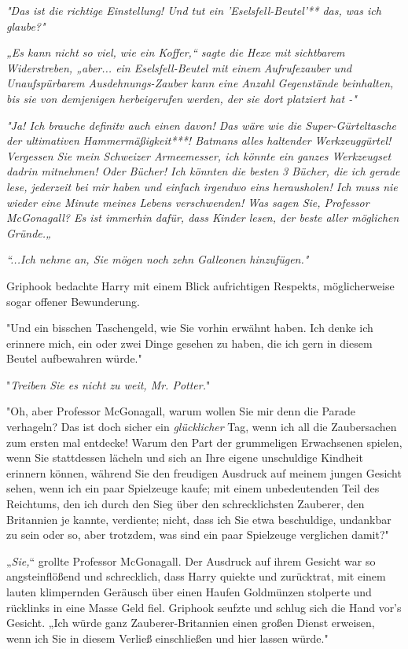 {\emph{"Das ist die richtige Einstellung! Und tut ein 'Eselsfell-Beutel'** das, was ich glaube?"}

\emph{„Es kann nicht so viel, wie ein Koffer,“ sagte die Hexe mit sichtbarem} \emph{Widerstreben, „aber... ein Eselsfell-Beutel mit einem} \emph{Aufrufezauber} \emph{und Unaufspürbarem Ausdehnungs-Zauber kann eine Anzahl Gegenstände beinhalten, bis sie von demjenigen herbeigerufen werden, der sie dort platziert hat -"}

\emph{"Ja! Ich brauche definitv auch einen davon! Das wäre wie die Super-Gürteltasche der ultimativen Hammermäßigkeit***! Batmans} \emph{alles haltender Werkzeuggürtel! Vergessen Sie mein Schweizer Armeemesser, ich könnte ein ganzes Werkzeugset dadrin mitnehmen! Oder} \emph{\emph{Bücher}! Ich könnten die besten 3 Bücher, die ich gerade lese, jederzeit bei mir haben und einfach irgendwo eins herausholen! Ich muss nie wieder eine Minute meines Lebens verschwenden! Was sagen Sie, Professor McGonagall? Es ist immerhin dafür, dass Kinder lesen, der beste aller möglichen Gründe.„}

\emph{“...Ich nehme an, Sie mögen noch zehn Galleonen hinzufügen."}

Griphook bedachte Harry mit einem Blick aufrichtigen Respekts, möglicherweise sogar offener Bewunderung.

"Und ein bisschen Taschengeld, wie Sie vorhin erwähnt haben. Ich denke ich erinnere mich, ein oder zwei Dinge gesehen zu haben, die ich gern in diesem Beutel aufbewahren würde."

"\emph{Treiben Sie es nicht zu weit, Mr. Potter.}"

"Oh, aber Professor McGonagall, warum wollen Sie mir denn die Parade verhageln? Das ist doch sicher ein \emph{glücklicher} Tag, wenn ich all die Zaubersachen zum ersten mal entdecke! Warum den Part der grummeligen Erwachsenen spielen, wenn Sie stattdessen lächeln und sich an Ihre eigene unschuldige Kindheit erinnern können, während Sie den freudigen Ausdruck auf meinem jungen Gesicht sehen, wenn ich ein paar Spielzeuge kaufe; mit einem unbedeutenden Teil des Reichtums, den ich durch den Sieg über den schrecklichsten Zauberer, den Britannien je kannte, verdiente; nicht, dass ich Sie etwa beschuldige, undankbar zu sein oder so, aber trotzdem, was sind ein paar Spielzeuge verglichen damit?"

„\emph{Sie,}“ grollte Professor McGonagall. Der Ausdruck auf ihrem Gesicht war so angsteinflößend und schrecklich, dass Harry quiekte und zurücktrat, mit einem lauten klimpernden Geräusch über einen Haufen Goldmünzen stolperte und rücklinks in eine Masse Geld fiel. Griphook seufzte und schlug sich die Hand vor's Gesicht. „Ich würde ganz Zauberer-Britannien einen großen Dienst erweisen, wenn ich Sie in diesem Verließ einschließen und hier lassen würde."

}
